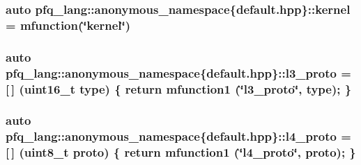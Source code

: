 \hypertarget{namespacepfq__lang_1_1anonymous__namespace_02default_8hpp_03_a68a2502f951a2b671a7d0496609f5d2a}{
\subsubsection[{kernel}]{\setlength{\rightskip}{0pt plus 5cm}auto pfq\+\_\+lang\+::anonymous\+\_\+namespace\{default.\+hpp\}\+::kernel = {\bf mfunction}(\char`\"{}kernel\char`\"{})}}\label{namespacepfq__lang_1_1anonymous__namespace_02default_8hpp_03_a68a2502f951a2b671a7d0496609f5d2a}
\hypertarget{namespacepfq__lang_1_1anonymous__namespace_02default_8hpp_03_aed01dd5380a873d92397ec0d4c07abac}{
\subsubsection[{l3\+\_\+proto}]{\setlength{\rightskip}{0pt plus 5cm}auto pfq\+\_\+lang\+::anonymous\+\_\+namespace\{default.\+hpp\}\+::l3\+\_\+proto = \mbox{[}$\,$\mbox{]} (uint16\+\_\+t type) \{ return {\bf mfunction1} (\char`\"{}l3\+\_\+proto\char`\"{}, type); \}}}\label{namespacepfq__lang_1_1anonymous__namespace_02default_8hpp_03_aed01dd5380a873d92397ec0d4c07abac}
\hypertarget{namespacepfq__lang_1_1anonymous__namespace_02default_8hpp_03_a75da77904f1cff4cc42fc3a081f80670}{
\subsubsection[{l4\+\_\+proto}]{\setlength{\rightskip}{0pt plus 5cm}auto pfq\+\_\+lang\+::anonymous\+\_\+namespace\{default.\+hpp\}\+::l4\+\_\+proto = \mbox{[}$\,$\mbox{]} (uint8\+\_\+t proto) \{ return {\bf mfunction1} (\char`\"{}l4\+\_\+proto\char`\"{}, proto); \}}}\label{namespacepfq__lang_1_1anonymous__namespace_02default_8hpp_03_a75da77904f1cff4cc42fc3a081f80670}
